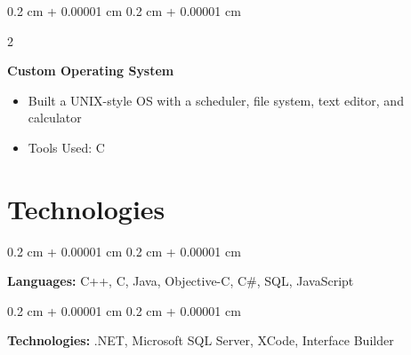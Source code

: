\documentclass[10pt, letterpaper]{article}
\newenvironment{highlights}{
    \begin{itemize}[
        topsep=0.10 cm,
        parsep=0.10 cm,
        partopsep=0pt,
        itemsep=0pt,
        leftmargin=0.4 cm + 10pt
    ]
}{
    \end{itemize}
} %
\newenvironment{onecolentry}{
    \begin{adjustwidth}{
        0.2 cm + 0.00001 cm
    }{
        0.2 cm + 0.00001 cm
    }
}{
    \end{adjustwidth}
} %
\newenvironment{twocolentry}[2][]{
    \onecolentry
    \def\secondColumn{#2}
    \setcolumnwidth{\fill, 4.5 cm}
    \begin{paracol}{2}
}{
    \switchcolumn \raggedleft \secondColumn
    \end{paracol}
    \endonecolentry
} %
\begin{document}
        \vspace{0.2 cm}

        \begin{twocolentry}{
            2002
        }
            \textbf{Custom Operating System}
            \begin{highlights}
                \item Built a UNIX-style OS with a scheduler, file system, text editor, and calculator
                \item Tools Used: C
            \end{highlights}
        \end{twocolentry}



    
    \section{Technologies}



        
        \begin{onecolentry}
            \textbf{Languages:} C++, C, Java, Objective-C, C\#, SQL, JavaScript
        \end{onecolentry}

        \vspace{0.2 cm}

        \begin{onecolentry}
            \textbf{Technologies:} .NET, Microsoft SQL Server, XCode, Interface Builder
        \end{onecolentry}


    
\end{document}
